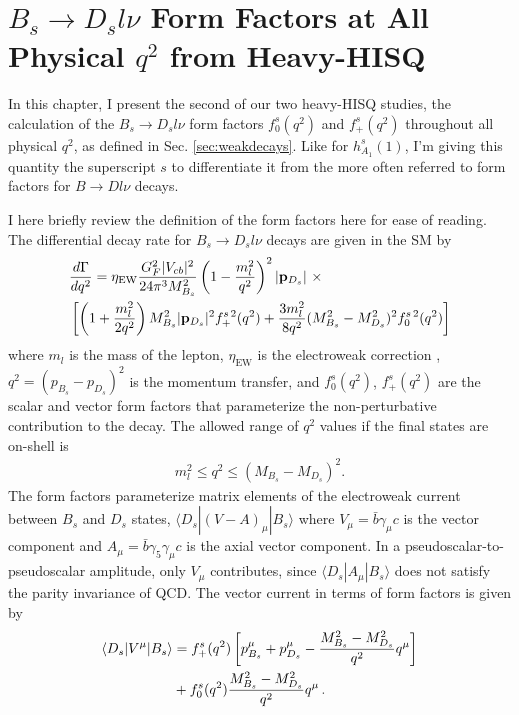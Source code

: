 ﻿
\chapter{$B_s\to D_sl\nu$ Form Factors at All Physical $q^2$ from Heavy-HISQ}
\label{chap:BsDs}

In this chapter, I present the second of our two heavy-HISQ studies, the calculation of the $B_s\to D_sl\nu$ form factors $f^s_0(q^2)$ and $f^s_+(q^2)$ throughout all physical $q^2$, as defined in Sec. \ref{sec:weakdecays}. Like for $h_{A_1}^s(1)$, I'm giving this quantity the superscript $s$ to differentiate it from the more often referred to form factors for $B\to Dl\nu$ decays.

I here briefly review the definition of the form factors here for ease of reading. The differential decay rate for $B_s\to D_s l \nu$ decays are given in the SM by
\begin{align}
  &{d\Gamma\over dq^2} = \eta_{\text{EW}} { G_F^2 |V_{cb}|^2\over 24 \pi^3 M_{B_s}^2 } \left( 1 - {m_l^2\over q^2}\right)^2 |{\bf{p}}_{D_s}| \,\,\times \\
  \label{eq:branchingfraction}
  &\left[ \left( 1 + {m_l^2\over 2q^2}\right) M_{B_s}^2 |{\bf{p}}_{D_s}|^2 f_+^{s\,2}(q^2) + {3m_l^2\over 8q^2} (M_{B_s}^2-M_{D_s}^2)^2 f_0^{s\,2}(q^2) \right] \nonumber
\end{align}
where $m_l$ is the mass of the lepton, $\eta_{\text{EW}}$ is the electroweak correction \cite{SIRLIN198283,Ginsberg1968,PhysRevD.41.1736}, $q^2 = (p_{B_s} - p_{D_s})^2$ is the momentum transfer, and $f_0^s(q^2)$, $f_+^s(q^2)$ are the scalar and vector form factors that parameterize the non-perturbative contribution to the decay. The allowed range of $q^2$ values if the final states are on-shell is
\begin{align}
  m_l^2 \leq q^2 \leq (M_{B_s}-M_{D_s})^2.
\end{align}
The form factors parameterize matrix elements of the electroweak current between $B_s$ and $D_s$ states, $\langle D_s | (V-A)_{\mu} | B_s \rangle$ where $V_{\mu}=\bar{b}\gamma_{\mu}c$ is the vector component and $A_{\mu}=\bar{b}\gamma_5\gamma_{\mu} c$ is the axial vector component. In a pseudoscalar-to-pseudoscalar amplitude, only $V_{\mu}$ contributes, since $\langle D_s | A_{\mu} | B_s \rangle$ does not satisfy the parity invariance of QCD. The vector current in terms of form factors is given by
\begin{align}
  \langle D_s | V^{\mu} | B_s \rangle &= f_+^s(q^2) \left[ p_{B_s}^{\mu} + p_{D_s}^{\mu} - {M_{B_s}^2 - M_{D_s}^2 \over q^2} q^{\mu} \right] \nonumber \\
  &+ f_0^s(q^2) { M_{B_s}^2 - M_{D_s}^2 \over q^2} q^{\mu}\,.
  \label{eq:vectorcurrent}
\end{align}

